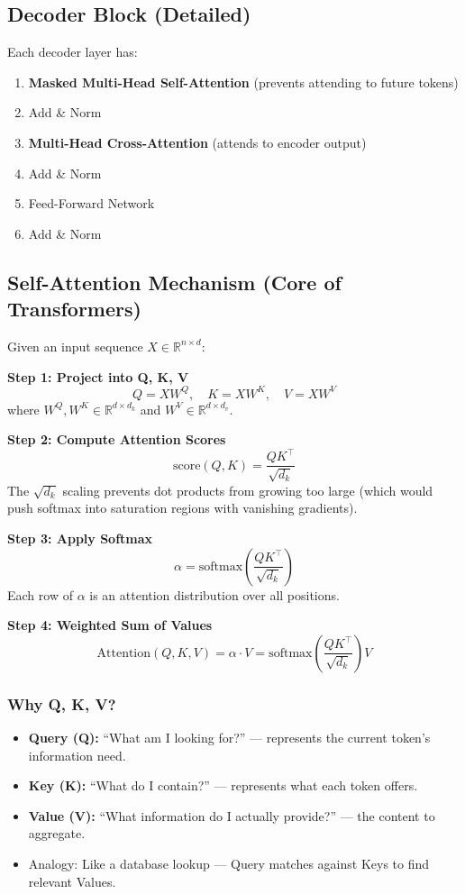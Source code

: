 \documentclass[11pt,a4paper]{article}
\begin{document}
\subsection{Decoder Block (Detailed)}
Each decoder layer has:
\begin{enumerate}[nosep]
  \item \textbf{Masked Multi-Head Self-Attention} (prevents attending to future tokens)
  \item Add \& Norm
  \item \textbf{Multi-Head Cross-Attention} (attends to encoder output)
  \item Add \& Norm
  \item Feed-Forward Network
  \item Add \& Norm
\end{enumerate}

\subsection{Self-Attention Mechanism (Core of Transformers)}

\begin{keybox}
Given an input sequence $X \in \mathbb{R}^{n \times d}$:

\textbf{Step 1: Project into Q, K, V}
\[
Q = X W^Q, \quad K = X W^K, \quad V = X W^V
\]
where $W^Q, W^K \in \mathbb{R}^{d \times d_k}$ and $W^V \in \mathbb{R}^{d \times d_v}$.

\textbf{Step 2: Compute Attention Scores}
\[
\text{score}(Q,K) = \frac{Q K^\top}{\sqrt{d_k}}
\]
The $\sqrt{d_k}$ scaling prevents dot products from growing too large (which would push softmax into saturation regions with vanishing gradients).

\textbf{Step 3: Apply Softmax}
\[
\alpha = \text{softmax}\!\left(\frac{Q K^\top}{\sqrt{d_k}}\right)
\]
Each row of $\alpha$ is an attention distribution over all positions.

\textbf{Step 4: Weighted Sum of Values}
\[
\text{Attention}(Q,K,V) = \alpha \cdot V = \text{softmax}\!\left(\frac{Q K^\top}{\sqrt{d_k}}\right) V
\]
\end{keybox}

\subsubsection{Why Q, K, V?}
\begin{itemize}[nosep]
  \item \textbf{Query (Q):} ``What am I looking for?'' --- represents the current token's information need.
  \item \textbf{Key (K):} ``What do I contain?'' --- represents what each token offers.
  \item \textbf{Value (V):} ``What information do I actually provide?'' --- the content to aggregate.
  \item Analogy: Like a database lookup --- Query matches against Keys to find relevant Values.
\end{itemize}
\end{document}
